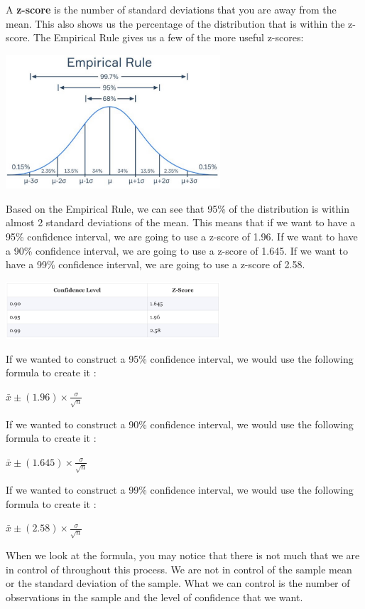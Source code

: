 \documentclass[
  letterpaper,
  DIV=11,
  numbers=noendperiod]{scrreprt}
\begin{document}
A \textbf{z-score} is the number of standard deviations that you are
away from the mean. This also shows us the percentage of the
distribution that is within the z-score. The Empirical Rule gives us a
few of the more useful z-scores:

\includegraphics[width=0.6\textwidth,height=\textheight]{./images/EPCI_1.jpg}

Based on the Empirical Rule, we can see that 95\% of the distribution is
within almost 2 standard deviations of the mean. This means that if we
want to have a 95\% confidence interval, we are going to use a z-score
of 1.96. If we want to have a 90\% confidence interval, we are going to
use a z-score of 1.645. If we want to have a 99\% confidence interval,
we are going to use a z-score of 2.58.

\includegraphics[width=0.6\textwidth,height=\textheight]{./images/EPCI_2.jpg}

If we wanted to construct a 95\% confidence interval, we would use the
following formula to create it :

\(\displaystyle{\bar{x} \pm (1.96) \times \frac{\sigma}{\sqrt{n}}}\)

If we wanted to construct a 90\% confidence interval, we would use the
following formula to create it :

\(\displaystyle{\bar{x} \pm (1.645) \times \frac{\sigma}{\sqrt{n}}}\)

If we wanted to construct a 99\% confidence interval, we would use the
following formula to create it :

\(\displaystyle{\bar{x} \pm (2.58) \times \frac{\sigma}{\sqrt{n}}}\)

When we look at the formula, you may notice that there is not much that
we are in control of throughout this process. We are not in control of
the sample mean or the standard deviation of the sample. What we can
control is the number of observations in the sample and the level of
confidence that we want.
\end{document}
